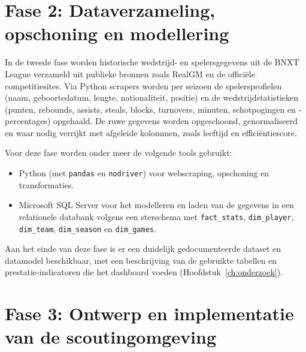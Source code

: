 \section{Fase 2: Dataverzameling, opschoning en modellering}

In de tweede fase worden historische wedstrijd- en spelersgegevens uit de BNXT League verzameld uit publieke bronnen zoals RealGM en de officiële competitiesites. Via Python scrapers worden per seizoen de spelersprofielen (naam, geboortedatum, lengte, nationaliteit, positie) en de wedstrijdstatistieken (punten, rebounds, assists, steals, blocks, turnovers, minuten, schotpogingen en -percentages) opgehaald. De ruwe gegevens worden opgeschoond, genormaliseerd en waar nodig verrijkt met afgeleide kolommen, zoals leeftijd en efficiëntiescore.

Voor deze fase worden onder meer de volgende tools gebruikt:
\begin{itemize}
  \item Python (met \texttt{pandas} en \texttt{nodriver}) voor webscraping, opschoning en transformaties.
  \item Microsoft SQL Server voor het modelleren en laden van de gegevens in een relationele databank volgens een sterschema met \texttt{fact\_stats}, \texttt{dim\_player}, \texttt{dim\_team}, \texttt{dim\_season} en \texttt{dim\_games}.
\end{itemize}
Aan het einde van deze fase is er een duidelijk gedocumenteerde dataset en datamodel beschikbaar, met een beschrijving van de gebruikte tabellen en prestatie-indicatoren die het dashboard voeden (Hoofdstuk~\ref{ch:onderzoek}).

\section{Fase 3: Ontwerp en implementatie van de scoutingomgeving}

